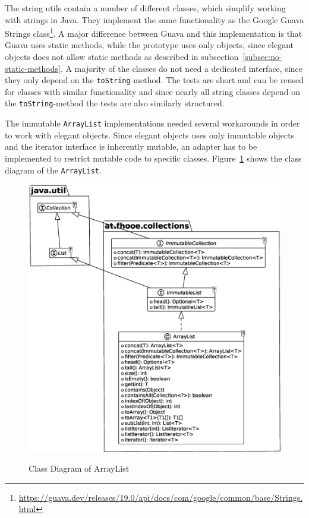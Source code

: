 The string utils contain a number of different classes, which simplify working with strings in Java.
They implement the same functionality as the Google Guava Strings class\footnote{\url{https://guava.dev/releases/19.0/api/docs/com/google/common/base/Strings.html}}.
A major difference between Guava and this implementation is that Guava uses static methods, while the prototype uses only objects, since elegant objects does not allow static methods as described in subsection\ \ref{subsec:no-static-methods}.
A majority of the classes do not need a dedicated interface, since they only depend on the \texttt{toString}-method.
The tests are short and can be reused for classes with similar functionality and since nearly all string classes depend on the \texttt{toString}-method the tests are also similarly structured.

The immutable \texttt{ArrayList} implementations needed several workarounds in order to work with elegant objects.
Since elegant objects uses only immutable objects and the iterator interface is inherently mutable, an adapter has to be implemented to restrict mutable code to specific classes.
Figure\ \ref{fig:arraylist-class-diagram} shows the class diagram of the \texttt{ArrayList}.

\begin{figure}[h]
    \caption{Class Diagram of ArrayList}
    \includegraphics[scale=0.25]{assets/uml/ArrayList-0}
    \label{fig:arraylist-class-diagram}
\end{figure}

